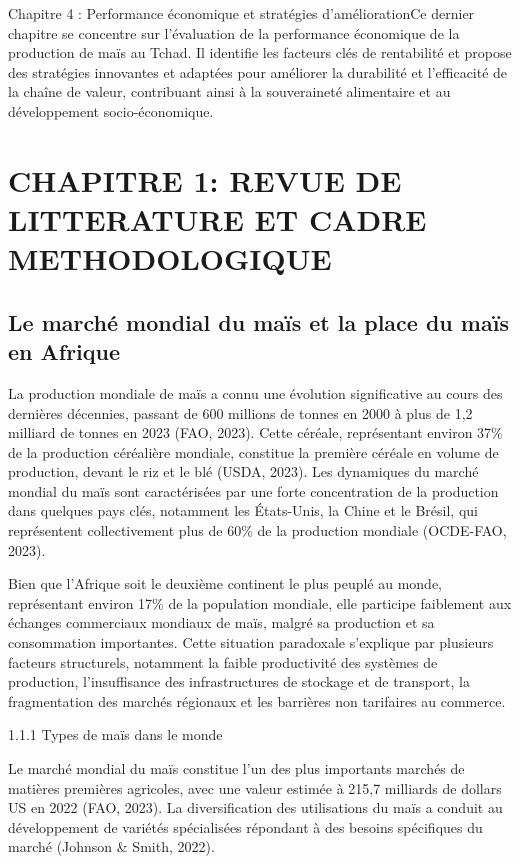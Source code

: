 \documentclass[12pt,oneside]{report}
\begin{document}
Chapitre 4 : Performance économique et stratégies d’améliorationCe dernier chapitre se concentre sur l’évaluation de la performance économique de la production de maïs au Tchad. Il identifie les facteurs clés de rentabilité et propose des stratégies innovantes et adaptées pour améliorer la durabilité et l'efficacité de la chaîne de valeur, contribuant ainsi à la souveraineté alimentaire et au développement socio-économique.

\chapter{CHAPITRE 1: REVUE DE LITTERATURE ET CADRE METHODOLOGIQUE}
\section{Le marché mondial du maïs et la place du maïs en Afrique}
La production mondiale de maïs a connu une évolution significative au cours des dernières décennies, passant de 600 millions de tonnes en 2000 à plus de 1,2 milliard de tonnes en 2023 (FAO, 2023). Cette céréale, représentant environ 37\% de la production céréalière mondiale, constitue la première céréale en volume de production, devant le riz et le blé (USDA, 2023). Les dynamiques du marché mondial du maïs sont caractérisées par une forte concentration de la production dans quelques pays clés, notamment les États-Unis, la Chine et le Brésil, qui représentent collectivement plus de 60\% de la production mondiale (OCDE-FAO, 2023).

Bien que l'Afrique soit le deuxième continent le plus peuplé au monde, représentant environ 17\% de la population mondiale, elle participe faiblement aux échanges commerciaux mondiaux de maïs, malgré sa production et sa consommation importantes. Cette situation paradoxale s'explique par plusieurs facteurs structurels, notamment la faible productivité des systèmes de production, l'insuffisance des infrastructures de stockage et de transport, la fragmentation des marchés régionaux et les barrières non tarifaires au commerce.

1.1.1 Types de maïs dans le monde

Le marché mondial du maïs constitue l'un des plus importants marchés de matières premières agricoles, avec une valeur estimée à 215,7 milliards de dollars US en 2022 (FAO, 2023). La diversification des utilisations du maïs a conduit au développement de variétés spécialisées répondant à des besoins spécifiques du marché (Johnson \& Smith, 2022).
\end{document}

